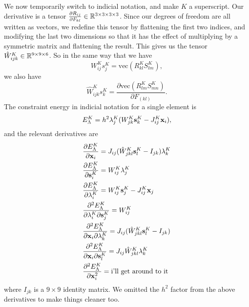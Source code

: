 We now temporarily switch to indicial notation, and make $K$ a superscript. Our derivative is a tensor $\frac{\partial R_{ij}}{\partial F_{kl}} \in \mathbb{R}^{3 \times 3 \times 3 \times 3}$. Since our degrees of freedom are all written as vectors, we redefine this tensor by flattening the first two indices, and modifying the last two dimensions so that it has the effect of multiplying by a symmetric matrix and flattening the result. This gives us the tensor $\hat{W}^K_{ijk} \in \mathbb{R}^{9 \times 9 \times 6}$. So in the same way that we have
\begin{equation}
W^K_{ij}s^K_j = \text{vec}(R^K_{kl} S^K_{lm}),
\end{equation}
we also have
\begin{equation}
\hat{W}^K_{ijk}s^K_{k} = \frac{\partial \text{vec}(R^K_{lm}S^K_{mn})}{\partial F_{(kl)}}.
\end{equation}
The constraint energy in indicial notation for a single element is 
\begin{equation}
E_\Lambda^K = h^2 \mathbf{\lambda}_j^K(W^K_{jk}\mathbf{s}^K_k - J^K_{ij}\mathbf{x}_i),
\end{equation}
and the relevant derivatives are
\begin{align}
&\frac{\partial E_\Lambda^K}{\partial \mathbf{x}_i} = 
J_{ij}(\hat{W}^K_{jkl}\mathbf{s}^K_l - I_{jk})\mathbf{\lambda}^K_k \\
&\frac{\partial E_\Lambda^K}{\partial \mathbf{s}^K_i}  = 
W_{ij}^K \mathbf{\lambda}^K_{j} \\
&\frac{\partial E_\Lambda^K}{\partial \mathbf{\lambda}^K_i} = 
W_{ij}^K \mathbf{s}^{K}_j - J_{ij}^K \mathbf{x}_j \\
&\frac{\partial^2 E_\Lambda^K}{\partial \mathbf{\lambda}^K_i \partial \mathbf{s}^K_j} =
W^K_{ij} \\
&\frac{\partial^2 E_\Lambda^K}{\partial \mathbf{x}_i \partial \mathbf{\lambda}^K_k} =
J_{ij}(\hat{W}^K_{jkl}\mathbf{s}^K_l - I_{jk}) \\
&\frac{\partial^2 E_\Lambda^K}{\partial \mathbf{x}_i \partial \mathbf{s}_l^K} =
J_{ij}\hat{W}^K_{jkl}\mathbf{\lambda}^K_k \\
&\frac{\partial^2 E_\Lambda^K}{\partial \mathbf{x}_i^2} =
\text{i'll get around to it} \\
\end{align}
where $I_{jk}$ is a $9 \times 9$ identity matrix. We omitted the $h^2$ factor from the above derivatives to make things cleaner too.



